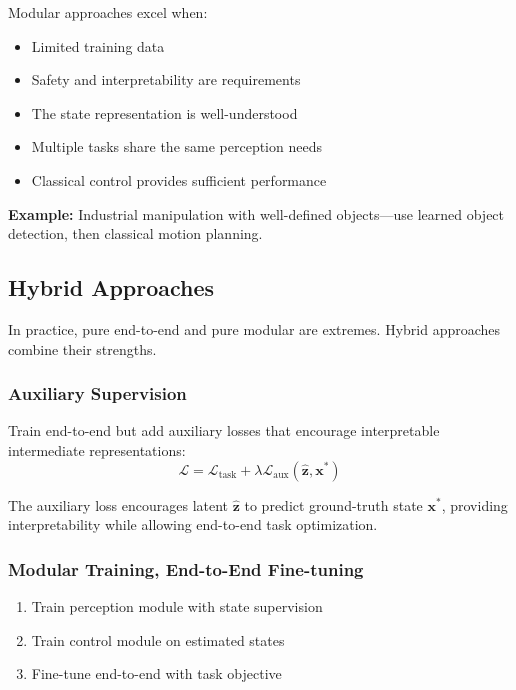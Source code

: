 Modular approaches excel when:
\begin{itemize}
    \item Limited training data
    \item Safety and interpretability are requirements
    \item The state representation is well-understood
    \item Multiple tasks share the same perception needs
    \item Classical control provides sufficient performance
\end{itemize}

\textbf{Example:} Industrial manipulation with well-defined objects---use learned object detection, then classical motion planning.

\subsection{Hybrid Approaches}

In practice, pure end-to-end and pure modular are extremes. Hybrid approaches combine their strengths.

\subsubsection{Auxiliary Supervision}

Train end-to-end but add auxiliary losses that encourage interpretable intermediate representations:
\begin{equation}
\mathcal{L} = \mathcal{L}_{\text{task}} + \lambda \mathcal{L}_{\text{aux}}(\hat{\mathbf{z}}, \mathbf{x}^*)
\label{eq:auxiliary_supervision}
\end{equation}

The auxiliary loss encourages latent $\hat{\mathbf{z}}$ to predict ground-truth state $\mathbf{x}^*$, providing interpretability while allowing end-to-end task optimization.

\subsubsection{Modular Training, End-to-End Fine-tuning}

\begin{enumerate}
    \item Train perception module with state supervision
    \item Train control module on estimated states
    \item Fine-tune end-to-end with task objective
\end{enumerate}

